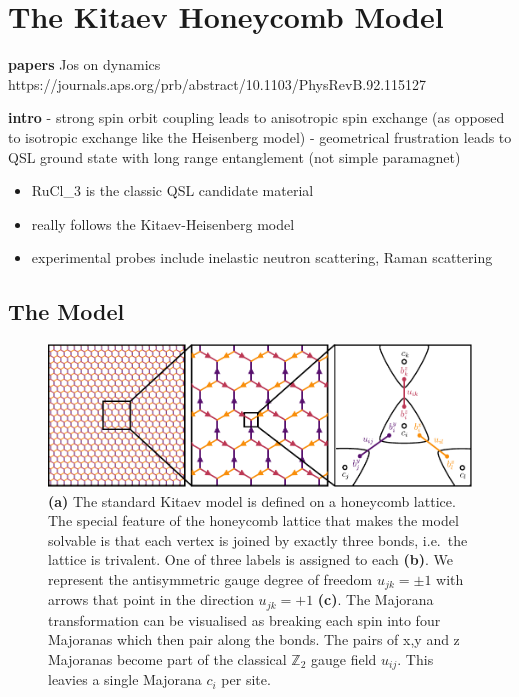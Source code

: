 \hypertarget{the-kitaev-honeycomb-model}{%
\section{The Kitaev Honeycomb Model}\label{the-kitaev-honeycomb-model}}

\textbf{papers} Jos on dynamics https://journals.aps.org/prb/abstract/10.1103/PhysRevB.92.115127

\textbf{intro} - strong spin orbit coupling leads to anisotropic spin exchange (as opposed to isotropic exchange like the Heisenberg model) - geometrical frustration leads to QSL ground state with long range entanglement (not simple paramagnet)

\begin{itemize}
\tightlist
\item
  RuCl\_3 is the classic QSL candidate material
\item
  really follows the Kitaev-Heisenberg model
\item
  experimental probes include inelastic neutron scattering, Raman scattering
\end{itemize}

\hypertarget{the-model}{%
\subsection{The Model}\label{the-model}}

\hypertarget{fig:intro_figure_by_hand}{%
\begin{figure}
\centering
\includegraphics[width=1\textwidth,height=\textheight]{figure_code/amk_chapter/intro/honeycomb_zoom/intro_figure_by_hand}
\caption[{The Kitaev Honeycomb Model}]{\textbf{(a)} The standard Kitaev model is defined on a honeycomb lattice. The special feature of the honeycomb lattice that makes the model solvable is that each vertex is joined by exactly three bonds, i.e.~the lattice is trivalent. One of three labels is assigned to each \textbf{(b)}. We represent the antisymmetric gauge degree of freedom \(u_{jk} = \pm 1\) with arrows that point in the direction \(u_{jk} = +1\) \textbf{(c)}. The Majorana transformation can be visualised as breaking each spin into four Majoranas which then pair along the bonds. The pairs of x,y and z Majoranas become part of the classical \(\mathbb{Z}_2\) gauge field \(u_{ij}\). This leavies a single Majorana \(c_i\) per site.}
\label{fig:intro_figure_by_hand}
\end{figure}
}

